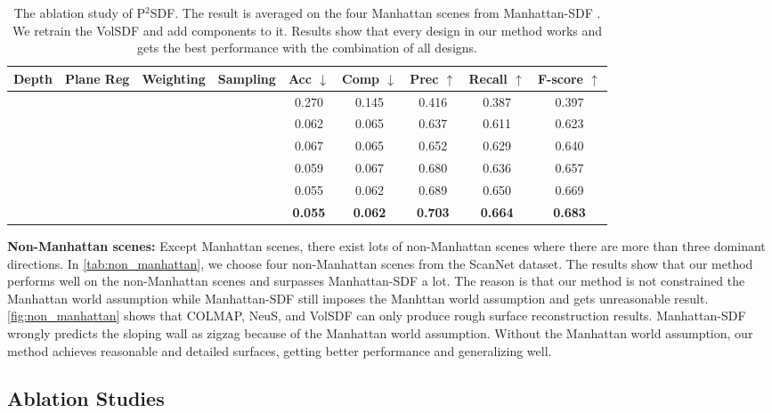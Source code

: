 \documentclass[10pt,journal,compsoc]{IEEEtran}
\begin{document}
\begin{table*}[htbp]
	\centering
	\caption{The ablation study of P$^2$SDF. The result is averaged on the four Manhattan scenes from Manhattan-SDF \cite{guo2022neural}. We retrain the VolSDF and add components to it. Results show that every design in our method works and gets the best performance with the combination of all designs.}
	\begin{tabular}{cccc|ccccc}
		\toprule
		Depth & Plane Reg & Weighting & Sampling & Acc $\downarrow$ & Comp $\downarrow$ & Prec $\uparrow$ & Recall $\uparrow$ & \textbf{F-score} $\uparrow$ \\
		\midrule
		&           &            &            & 0.270 & 0.145 & 0.416 & 0.387 & 0.397 \\
		\checkmark &           &            &            & 0.062 & 0.065 & 0.637 & 0.611 & 0.623 \\
		\checkmark &           &            & \checkmark & 0.067 & 0.065 & 0.652 & 0.629 & 0.640 \\
		\checkmark &\checkmark &            &            & 0.059 & 0.067 & 0.680 & 0.636 & 0.657 \\
		\checkmark &\checkmark & \checkmark &            & 0.055 & 0.062 & 0.689 & 0.650 & 0.669 \\
		\checkmark &\checkmark & \checkmark & \checkmark & \textbf{0.055} & \textbf{0.062} & \textbf{0.703} & \textbf{0.664} & \textbf{0.683} \\
		\bottomrule
	\end{tabular}
	\label{tab:ablation}
\end{table*}
\noindent\textbf{Non-Manhattan scenes:} Except Manhattan scenes, there exist lots of non-Manhattan scenes where there are more than three dominant directions. In \cref{tab:non_manhattan}, we choose four non-Manhattan scenes from the ScanNet dataset. The results show that our method performs well on the non-Manhattan scenes and surpasses Manhattan-SDF a lot. The reason is that our method is not constrained the Manhattan world assumption while Manhattan-SDF still imposes the Manhttan world assumption and gets unreasonable result. \cref{fig:non_manhattan} shows that COLMAP, NeuS, and VolSDF can only produce rough surface reconstruction results. Manhattan-SDF wrongly predicts the sloping wall as zigzag because of the Manhattan world assumption. Without the Manhattan world assumption, our method achieves reasonable and detailed surfaces, getting better performance and generalizing well.

\subsection{Ablation Studies}
\end{document}
